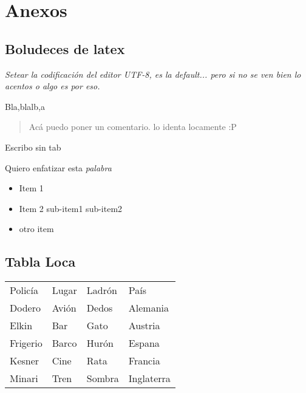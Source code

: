 \section{Anexos}

\subsection{Boludeces de latex}

\emph{Setear la codificación del editor UTF-8, es la default... pero si no se ven bien lo acentos o algo es por eso.}

Bla,blalb,a
\begin{quotation}
Acá puedo poner un comentario. lo identa locamente :P
\end{quotation}

\begin{flushleft}
Escribo sin tab
\end{flushleft}
Quiero enfatizar esta \emph{palabra}
\begin{itemize}
\item Item 1
\item Item 2
\subitem sub-item1
\subitem sub-item2
\item otro item
\end{itemize}

\subsection{Tabla Loca}

\begin{center} %
\begin{tabularx}{0.97\linewidth}{XXXX} %

Policía &	Lugar	&	Ladrón	&	País		\\
Dodero	&	Avión	&	Dedos	&	Alemania	\\
Elkin	&	Bar	&	Gato	&	Austria		\\
Frigerio&	Barco	&	Hurón	&	Espana		\\
Kesner	&	Cine	&	Rata	&	Francia		\\
Minari	&	Tren	&	Sombra	&	Inglaterra	\\

\end{tabularx}
\end{center}
